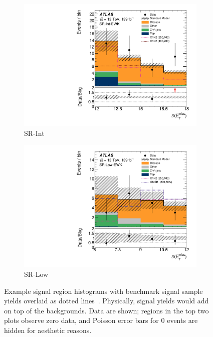 \begin{figure}[tp]
\begin{subfigure}{0.49\textwidth}
\includegraphics[width=\textwidth]{figures/2ljets_sr_int_met_sig.pdf}
\caption{SR-Int}
\end{subfigure}
\hfill
\begin{subfigure}{0.49\textwidth}
\centering
\includegraphics[width=\textwidth]{figures/2ljets_sr_low_met_sig.pdf}
\caption{SR-Low}
\end{subfigure}
\caption{%
Example signal region histograms with benchmark signal sample yields overlaid
as dotted lines~\cite{atlas2022searches}.
Physically, signal yields would add on top of the backgrounds.
Data are shown; regions in the top two plots observe zero data, and
Poisson error bars for $0$ events are hidden for aesthetic reasons.
}
\label{fig:2ljets_signal_examples}
\end{figure}


